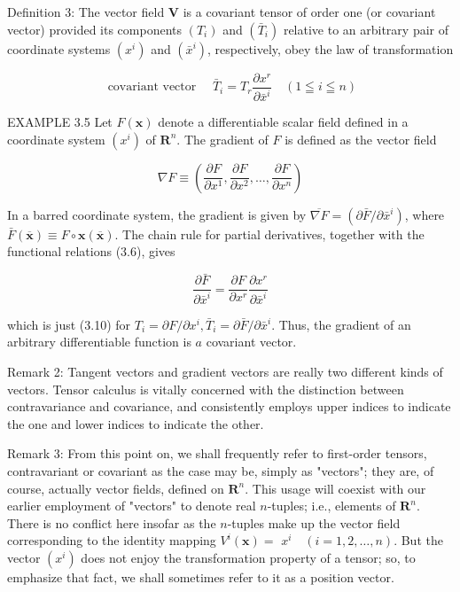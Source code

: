 \documentclass[10pt]{article}
\begin{document}
Definition 3: The vector field $\mathbf{V}$ is a covariant tensor of order one (or covariant vector) provided its components $\left(T_{i}\right)$ and $\left(\bar{T}_{i}\right)$ relative to an arbitrary pair of coordinate systems $\left(x^{i}\right)$ and $\left(\bar{x}^{i}\right)$, respectively, obey the law of transformation


\begin{equation*}
\text { covariant vector } \quad \bar{T}_{i}=T_{r} \frac{\partial x^{r}}{\partial \bar{x}^{i}} \quad(1 \leqq i \leqq n) \tag{3.10}
\end{equation*}


EXAMPLE 3.5 Let $F(\mathbf{x})$ denote a differentiable scalar field defined in a coordinate system $\left(x^{i}\right)$ of $\mathbf{R}^{n}$. The gradient of $F$ is defined as the vector field

$$
\nabla F \equiv\left(\frac{\partial F}{\partial x^{1}}, \frac{\partial F}{\partial x^{2}}, \ldots, \frac{\partial F}{\partial x^{n}}\right)
$$

In a barred coordinate system, the gradient is given by $\overline{\nabla F}=\left(\partial \bar{F} / \partial \bar{x}^{i}\right)$, where $\bar{F}(\overline{\mathbf{x}}) \equiv F \circ \mathbf{x}(\overline{\mathbf{x}})$. The chain rule for partial derivatives, together with the functional relations (3.6), gives

$$
\frac{\partial \bar{F}}{\partial \bar{x}^{i}}=\frac{\partial F}{\partial x^{r}} \frac{\partial x^{r}}{\partial \bar{x}^{i}}
$$

which is just (3.10) for $T_{i}=\partial F / \partial x^{i}, \bar{T}_{i}=\partial \bar{F} / \partial \bar{x}^{i}$. Thus, the gradient of an arbitrary differentiable function is $a$ covariant vector.

Remark 2: Tangent vectors and gradient vectors are really two different kinds of vectors. Tensor calculus is vitally concerned with the distinction between contravariance and covariance, and consistently employs upper indices to indicate the one and lower indices to indicate the other.

Remark 3: From this point on, we shall frequently refer to first-order tensors, contravariant or covariant as the case may be, simply as "vectors"; they are, of course, actually vector fields, defined on $\mathbf{R}^{n}$. This usage will coexist with our earlier employment of "vectors" to denote real $n$-tuples; i.e., elements of $\mathbf{R}^{n}$. There is no conflict here insofar as the $n$-tuples make up the vector field corresponding to the identity mapping $V^{i}(\mathbf{x})=$ $x^{i} \quad(i=1,2, \ldots, n)$. But the vector $\left(x^{i}\right)$ does not enjoy the transformation property of a tensor; so, to emphasize that fact, we shall sometimes refer to it as a position vector.
\end{document}
